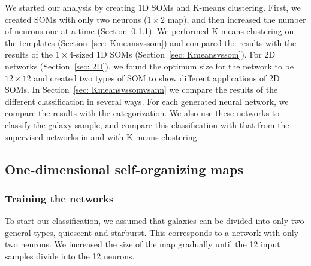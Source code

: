     We started our analysis by creating 1D SOMs and K-means clustering. 
    First, we created SOMs with only two neurons ($1\times2$ map), and then increased the number of neurons one at a time (Section~\ref{sec: 1Dt}).
    We performed K-means clustering on the  templates (Section~\ref{sec: Kmeansvssom}) and compared 
   the results with the results of the $1\times4$-sized 1D SOMs (Section~\ref{sec: Kmeansvssom}).
    For 2D networks (Section~\ref{sec: 2D}), we found the optimum size for the network to be $12\times12$ and created two types of SOM to show different applications of 2D SOMs.
    In Section~\ref{sec: Kmeansvssomvsann} we compare the results of the different classification in several ways. 
    For each generated neural network, we compare the results with the  categorization.
    We also use these networks to classify the  galaxy sample, and compare this classification with that from the supervised networks in  and with K-means clustering.



    \subsection{One-dimensional self-organizing maps}
    \label{sec: 1D_somz}
        \subsubsection{Training the networks}
        \label{sec: 1Dt}
            To start our classification, we assumed that galaxies can be divided into only two general types, quiescent and starburst.
            This corresponds to a network with only two neurons.
            We increased the size of the map gradually until the 12 input samples divide into the 12 neurons. 
        
